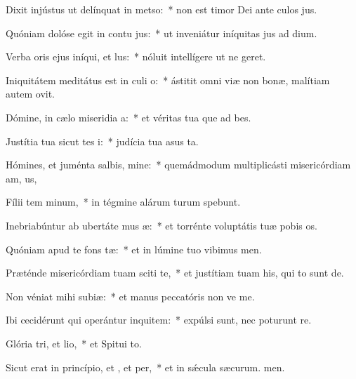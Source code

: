 \item Dixit injústus ut delínquat in metso:~* non est timor Dei ante culos jus.
\item Quóniam dolóse egit in contu jus:~* ut inveniátur iníquitas jus ad dium.
\item Verba oris ejus iníqui, et lus:~* nóluit intellígere ut ne geret.
\item Iniquitátem meditátus est in culi o:~* ástitit omni viæ non bonæ, malítiam autem  ovit.
\item Dómine, in cælo miseridia a:~* et véritas tua que ad bes.
\item Justítia tua sicut tes i:~* judícia tua asus ta.
\item Hómines, et juménta salbis, mine:~* quemádmodum multiplicásti misericórdiam am, us,
\item Fílii tem minum,~* in tégmine alárum turum spebunt.
\item Inebriabúntur ab ubertáte mus æ:~* et torrénte voluptátis tuæ pobis os.
\item Quóniam apud te  fons tæ:~* et in lúmine tuo vibimus men.
\item Præténde misericórdiam tuam sciti te,~* et justítiam tuam his, qui to sunt de.
\item Non véniat mihi  subiæ:~* et manus peccatóris non ve me.
\item Ibi cecidérunt qui operántur inquitem:~* expúlsi sunt, nec poturunt re.
\item Glória tri, et lio,~* et Spitui to.
\item Sicut erat in princípio, et , et per,~* et in sǽcula sæcurum. men.

